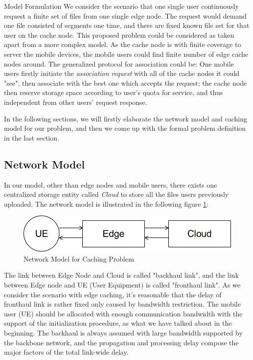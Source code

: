 \documentclass{article}
\begin{document}
\begin{section}{Model Formulation}
    \label{sec:formulation}
    We consider the scenario that one single user continuously request a finite set of files from one single edge node. The request would demand one file consisted of segments one time, and there are fixed known file set for that user on the cache node.
    This proposed problem could be considered as taken apart from a more complex model. As the cache node is with finite coverage to server the mobile devices, the mobile users could find finite number of edge cache nodes around. The generalized protocol for association could be: One mobile users firstly initiate the \textit{association request} with all of the cache nodes it could "see", then associate with the best one which accepts the request; the cache node then reserve storage space according to user's quota for service, and thus independent from other users' request response.
    
    In the following sections, we will firstly elaborate the network model and caching model for our problem, and then we come up with the formal problem definition in the last section.

    \subsection{Network Model}
    \label{net_model}
    In our model, other than edge nodes and mobile users, there exists one centralized storage entity called \emph{Cloud} to store all the files users previously uploaded.
    The network model is illustrated in the following figure \ref{fig:network}:

    \begin{figure}[h!]
        \centering
        \includegraphics[width=0.8\linewidth]{images/network.png}
        \caption{Network Model for Caching Problem}
        \label{fig:network}
    \end{figure}

    The link between Edge Node and Cloud is called "backhaul link", and the link between Edge node and UE (User Equipment) is called "fronthaul link".
    As we consider the scenario with edge caching, it's reasonable that the delay of fronthaul link is rather fixed only caused by bandwidth restriction. The mobile user (UE) should be allocated with enough communication bandwidth with the support of the initialization procedure, as what we have talked about in the beginning. The backhaul is always assumed with large bandwidth supported by the backbone network, and the propagation and processing delay compose the major factors of the total link-wide delay.


\end{section}
\end{document}
